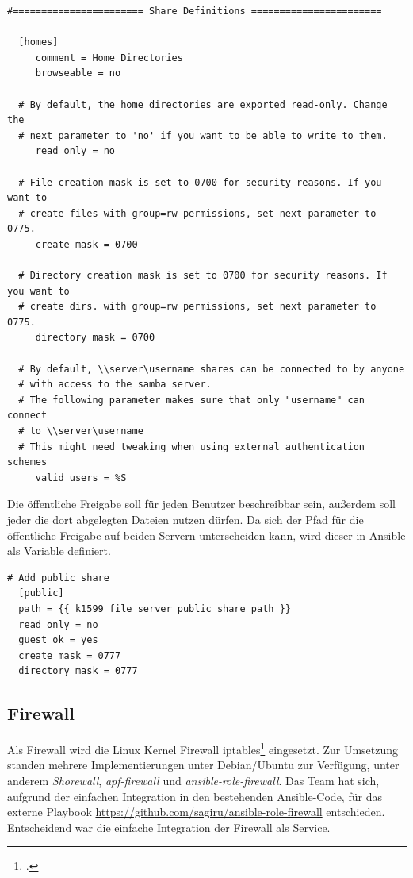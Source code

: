 \begin{lstlisting}[label=code:smbconf5,caption=Auszug aus /etc/samba/smb.conf]
  #======================= Share Definitions =======================

  [homes]
     comment = Home Directories
     browseable = no

  # By default, the home directories are exported read-only. Change the
  # next parameter to 'no' if you want to be able to write to them.
     read only = no

  # File creation mask is set to 0700 for security reasons. If you want to
  # create files with group=rw permissions, set next parameter to 0775.
     create mask = 0700

  # Directory creation mask is set to 0700 for security reasons. If you want to
  # create dirs. with group=rw permissions, set next parameter to 0775.
     directory mask = 0700

  # By default, \\server\username shares can be connected to by anyone
  # with access to the samba server.
  # The following parameter makes sure that only "username" can connect
  # to \\server\username
  # This might need tweaking when using external authentication schemes
     valid users = %S
\end{lstlisting}

Die öffentliche Freigabe soll für jeden Benutzer beschreibbar sein, außerdem soll jeder die dort abgelegten Dateien nutzen dürfen. Da sich der Pfad für die öffentliche Freigabe auf beiden Servern unterscheiden kann, wird dieser in Ansible als Variable definiert.

\begin{lstlisting}[label=code:smbconf5,caption=Auszug aus /etc/samba/smb.conf]
  # Add public share
  [public]
  path = {{ k1599_file_server_public_share_path }}
  read only = no
  guest ok = yes
  create mask = 0777
  directory mask = 0777
\end{lstlisting}

\subsection{Firewall}
Als Firewall wird die Linux Kernel Firewall iptables\footcite{iptables} eingesetzt. Zur Umsetzung standen mehrere Implementierungen unter Debian/Ubuntu zur Verfügung, unter anderem \emph{Shorewall}, \emph{apf-firewall} und \emph{ansible-role-firewall}. Das Team hat sich, aufgrund der einfachen Integration in den bestehenden Ansible-Code, für das externe Playbook \url{https://github.com/sagiru/ansible-role-firewall} entschieden. Entscheidend war die einfache Integration der Firewall als Service. \\


